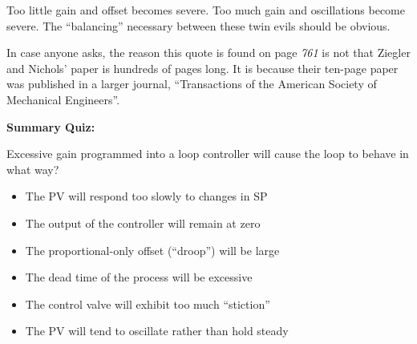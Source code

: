 












Too little gain and offset becomes severe.  Too much gain and oscillations become severe.  The ``balancing'' necessary between these twin evils should be obvious.

\vskip 10pt

In case anyone asks, the reason this quote is found on page {\it 761} is not that Ziegler and Nichols' paper is hundreds of pages long.  It is because their ten-page paper was published in a larger journal, ``Transactions of the American Society of Mechanical Engineers''.











\vfil \eject

\noindent
{\bf Summary Quiz:}

Excessive gain programmed into a loop controller will cause the loop to behave in what way?

\begin{itemize}
\item{} The PV will respond too slowly to changes in SP
\vskip 5pt 
\item{} The output of the controller will remain at zero
\vskip 5pt 
\item{} The proportional-only offset (``droop'') will be large
\vskip 5pt 
\item{} The dead time of the process will be excessive
\vskip 5pt 
\item{} The control valve will exhibit too much ``stiction''
\vskip 5pt 
\item{} The PV will tend to oscillate rather than hold steady
\end{itemize}




